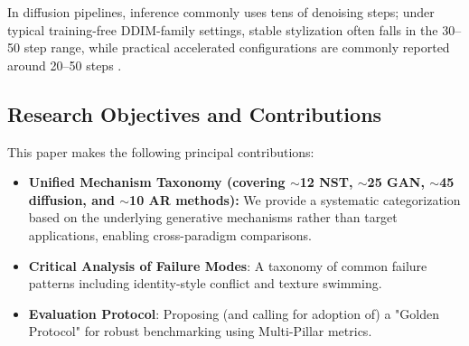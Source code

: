 \documentclass[journal]{IEEEtran}
\begin{document}
In diffusion pipelines, inference commonly uses tens of denoising steps; under typical training-free DDIM-family settings, stable stylization often falls in the 30--50 step range, while practical accelerated configurations are commonly reported around 20--50 steps \cite{song2020denoising,rombach_2022_cvpr}.

\subsection{Research Objectives and Contributions}
\label{sec:intro:contributions}
This paper makes the following principal contributions:
\begin{itemize}
  \item \textbf{Unified Mechanism Taxonomy (covering $\sim$12 NST, $\sim$25 GAN, $\sim$45 diffusion, and $\sim$10 AR methods):} We provide a systematic categorization based on the underlying generative mechanisms rather than target applications, enabling cross-paradigm comparisons.
  \item \textbf{Critical Analysis of Failure Modes}: A taxonomy of common failure patterns including identity-style conflict and texture swimming.
  \item \textbf{Evaluation Protocol}: Proposing (and calling for adoption of) a "Golden Protocol" for robust benchmarking using Multi-Pillar metrics.
\end{itemize}
\end{document}
